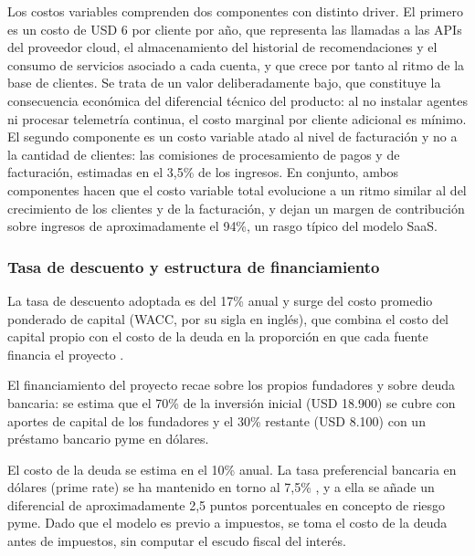 Los costos variables comprenden dos componentes con distinto driver. El primero es un costo de USD 6 por cliente por año, que representa las llamadas a las APIs del proveedor cloud, el almacenamiento del historial de recomendaciones y el consumo de servicios asociado a cada cuenta, y que crece por tanto al ritmo de la base de clientes. Se trata de un valor deliberadamente bajo, que constituye la consecuencia económica del diferencial técnico del producto: al no instalar agentes ni procesar telemetría continua, el costo marginal por cliente adicional es mínimo. El segundo componente es un costo variable atado al nivel de facturación y no a la cantidad de clientes: las comisiones de procesamiento de pagos y de facturación, estimadas en el 3,5\% de los ingresos. En conjunto, ambos componentes hacen que el costo variable total evolucione a un ritmo similar al del crecimiento de los clientes y de la facturación, y dejan un margen de contribución sobre ingresos de aproximadamente el 94\%, un rasgo típico del modelo SaaS.

\subsubsection{Tasa de descuento y estructura de financiamiento}

La tasa de descuento adoptada es del 17\% anual y surge del costo promedio ponderado de capital (WACC, por su sigla en inglés), que combina el costo del capital propio con el costo de la deuda en la proporción en que cada fuente financia el proyecto \parencite{Brealey2023}.

El financiamiento del proyecto recae sobre los propios fundadores y sobre deuda bancaria: se estima que el 70\% de la inversión inicial (USD 18.900) se cubre con aportes de capital de los fundadores y el 30\% restante (USD 8.100) con un préstamo bancario pyme en dólares.

El costo de la deuda se estima en el 10\% anual. La tasa preferencial bancaria en dólares (prime rate) se ha mantenido en torno al 7,5\% \parencite{FRED2026}, y a ella se añade un diferencial de aproximadamente 2,5 puntos porcentuales en concepto de riesgo pyme. Dado que el modelo es previo a impuestos, se toma el costo de la deuda antes de impuestos, sin computar el escudo fiscal del interés.

